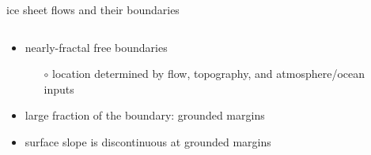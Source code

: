 \documentclass[hide notes,intlimits,usenames,dvipsnames]{beamer}
\begin{document}
\begin{frame}{ice sheet flows and their boundaries}
\begin{columns}
\begin{column}{0.45\textwidth}
\begin{itemize}
\item<1> nearly-fractal free boundaries
    \begin{itemize}
    \scriptsize
    \item[$\circ$] location determined by flow, topography, and atmosphere/ocean inputs
    \normalsize
    \end{itemize}
\item<2> large fraction of the boundary: grounded margins
\item<3> surface slope is discontinuous at grounded margins
\end{itemize}
\end{column}
\begin{column}{0.55\textwidth}

\end{column}
\end{columns}
\end{frame}
\end{document}
